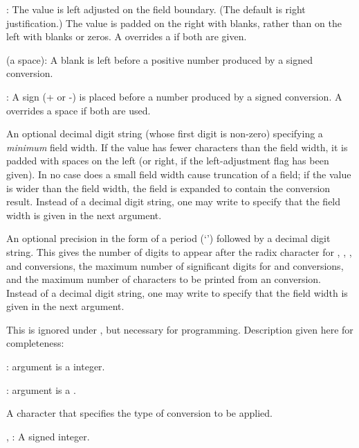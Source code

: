 \item \kbd{-}: The value is left adjusted on the field boundary. (The
default is right justification.) The value is padded on the right with
blanks, rather than on the left with blanks or zeros. A \kbd{-} overrides a
 if both are given.

\item {} (a space): A blank is left before a positive number
produced by a signed conversion.

\item \kbd{+}: A sign (+ or -) is placed before a number produced by a
signed conversion. A \kbd{+} overrides a space if both are used.

 An optional decimal digit string (whose first
digit is non-zero) specifying a \emph{minimum} field width. If the value has
fewer characters than the field width, it is padded with spaces on the left
(or right, if the left-adjustment flag has been given). In no case does a
small field width cause truncation of a field; if the value is wider than
the field width, the field is expanded to contain the conversion result.
Instead of a decimal digit string, one may write \kbd{*} to specify that the
field width is given in the next argument.

 An optional precision in the form of a period
(`') followed by a decimal digit string. This gives
the number of digits to appear after the radix character for ,
, , and  conversions, the maximum number of significant
digits for  and  conversions, and the maximum number of
characters to be printed from an  conversion.
Instead of a decimal digit string, one may write \kbd{*} to specify that the
field width is given in the next argument.

 This is ignored under , but
necessary for  programming. Description given here for
completeness:

\item {}: argument is a  integer.

\item {}: argument is a .

 A character that specifies the type of
conversion to be applied.

\item {}, : A signed integer.

